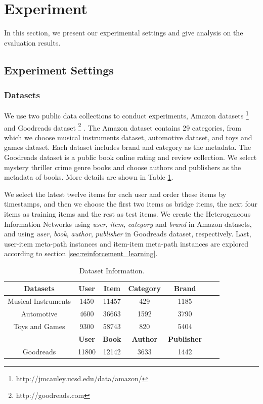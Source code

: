 
\section{Experiment}

In this section, we present our experimental settings and give analysis on the evaluation results.

\subsection{Experiment Settings}
\subsubsection{Datasets}

We use two public data collections to conduct experiments, Amazon datasets \footnote{http://jmcauley.ucsd.edu/data/amazon/} \cite{ni2019justifying} and Goodreads dataset \footnote{http://goodreads.com} \cite{DBLP:conf/recsys/WanM18, DBLP:conf/acl/WanMNM19}. The Amazon dataset contains 29 categories, from which we choose musical instruments dataset, automotive dataset, and toys and games dataset. Each dataset includes brand and category as the metadata. The Goodreads dataset is a public book online rating and review collection. We select mystery thriller crime genre books and choose authors and publishers as the metadata of books.
More details are shown in Table \ref{Dataset_Information}.

We select the latest twelve items for each user and order these items by timestamps, and then we choose the first two items as bridge items, the next four items as training items and the rest as test items. We create the Heterogeneous Information Networks using \textit{user}, \textit{item}, \textit{category} and \textit{brand} in Amazon datasets, and using \textit{user}, \textit{book}, \textit{author}, \textit{publisher} in Goodreads dataset, respectively. Last, user-item meta-path instances and item-item meta-path instances are explored according to section \ref{sec:reinforcement_learning}.



\begin{table}[]\centering
	
	\begin{tabular}{ccccccc}
		\hline
		\textbf{Datasets}& \textbf{User}& \textbf{Item} & \textbf{Category} & \textbf{Brand} \\ \hline
		Musical Instruments &1450&11457&429&1185\\ 
		Automotive &4600&36663&1592&3790\\ 
		Toys and Games&9300&58743&820&5404\\ 
		\hline \hline
		& \textbf{User}& \textbf{Book} & \textbf{Author} & \textbf{Publisher} \\ \hline
		Goodreads & 11800 & 12142 & 3633 & 1442\\ \hline
	\end{tabular}

	\caption{\label{Dataset_Information}Dataset Information.}
\end{table}


